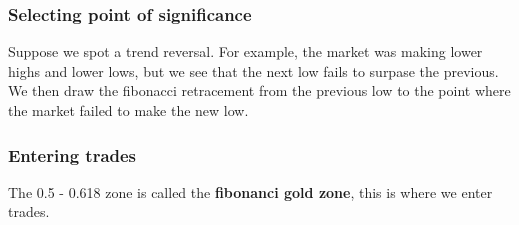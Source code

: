 \documentclass{report}
\begin{document}
     \subsubsection{Selecting point of significance}
     \bigbreak \noindent 
     Suppose we spot a trend reversal. For example, the market was making lower highs and lower lows, but we see that the next low fails to surpase the previous. 
     \bigbreak \noindent 
     We then draw the fibonacci retracement from the previous low to the point where the market failed to make the new low.
     \bigbreak \noindent 

     \bigbreak \noindent 
     \subsubsection{Entering trades}
     \bigbreak \noindent 
     The 0.5 - 0.618 zone is called the \textbf{fibonanci gold zone}, this is where we enter trades.
     \bigbreak \noindent 
     \bigbreak \noindent 
     \bigbreak \noindent 
















     



     




     






    
\end{document}
